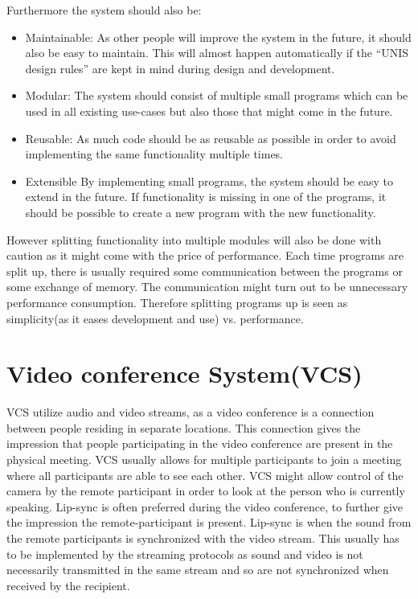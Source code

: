 
Furthermore the system should also be:

\begin{itemize}
	\item Maintainable:
As other people will improve the system in the future, it should also be easy to maintain. This will almost happen automatically if the ``UNIS design rules'' are kept in mind during design and development.
\item Modular:
The system should consist of multiple small programs which can be used in all existing use-cases but also those that might come in the future.
\item Reusable:
As much code should be as reusable as possible in order to avoid implementing the same functionality multiple times.
\item Extensible
    By implementing small programs, the system should be easy to extend in the future.
    If functionality is missing in one of the programs, it should be possible to create a new 
    program with the new functionality.
\end{itemize}

However splitting functionality into multiple modules will also be done with caution as it might come with the price of performance. Each time programs are split up, there is usually required some communication between the programs or some exchange of memory. The communication might turn out to be unnecessary performance consumption. Therefore splitting programs up is seen as simplicity(as it eases development and use) vs. performance.


\section{Video conference System(VCS)} \label{sec:design:vcs}
\ac{VCS} utilize audio and video streams, as a video conference is a connection between people residing in separate locations. This connection gives the impression that people participating in the video conference are present in the physical meeting. VCS usually allows for multiple participants to join a meeting where all participants are able to see each other. VCS might allow control of the camera by the remote participant in order to look at the person who is currently speaking. 
Lip-sync is often preferred during the video conference, to further give the impression the remote-participant is present. Lip-sync is when the sound from the remote participants is synchronized with the video stream. This usually has to be implemented by the streaming protocols as sound and video is not necessarily transmitted in the same stream and so are not synchronized when received by the recipient.

